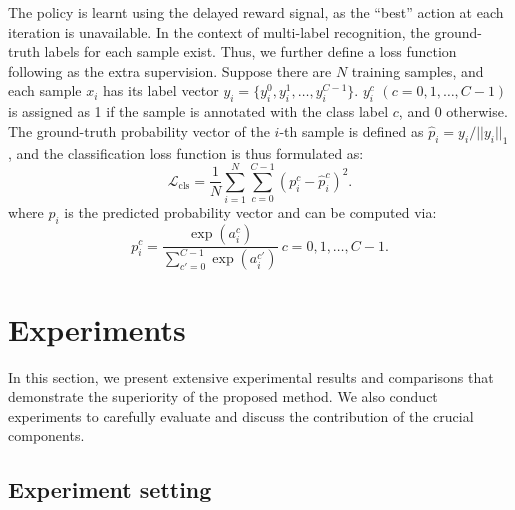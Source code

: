 \documentclass[letterpaper]{article} %
\begin{document}
The policy is learnt using the delayed reward signal, as the ``best'' action at each iteration is unavailable. In the context of multi-label recognition, the ground-truth labels for each sample exist. Thus, we further define a loss function following \cite{wei2016hcp,yang2016exploit} as the extra supervision. Suppose there are $N$ training samples, and each sample $x_i$ has its label vector $y_i=\{y_{i}^{0},y_{i}^{1},\dots,y_{i}^{C-1}\}$. $y_{i}^c$ $(c=0,1,\dots,C-1)$ is assigned as 1 if the sample is annotated with the class label $c$, and 0 otherwise. The ground-truth probability vector of the $i$-th sample is defined as $\hat{p}_i=y_i/||y_i||_1$, and the classification loss function is thus formulated as:
 \begin{equation}
      \mathcal{L}_{\textrm{cls}}=\frac{1}{N}\sum_{i=1}^N\sum_{c=0}^{C-1}(p_{i}^c-\hat{p}_{i}^c)^2.
\end{equation}
where $p_i$ is the predicted probability vector and can be computed via:
 \begin{equation}
      p_{i}^c= \frac{\exp(a_{i}^c)}{\sum_{c'=0}^{C-1}\exp(a_{i}^{c'})} \ c=0,1,\dots,C-1.
\end{equation}

\section{Experiments}
In this section, we present extensive experimental results and comparisons that demonstrate the superiority of the proposed method. We also conduct experiments to carefully evaluate and discuss the contribution of the crucial components.

\subsection{Experiment setting}
\end{document}
